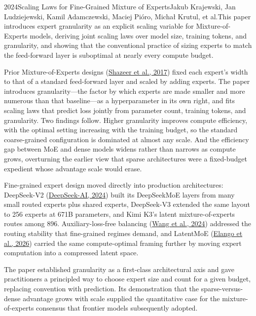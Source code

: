 
\begin{papersummary}{2024}{Scaling Laws for Fine-Grained Mixture of Experts}{Jakub Krajewski, Jan Ludziejewski, Kamil Adamczewski, Maciej Pi\'oro, Micha\l{} Krutul, et al.}{This paper introduces expert granularity as an explicit scaling variable for Mixture-of-Experts models, deriving joint scaling laws over model size, training tokens, and granularity, and showing that the conventional practice of sizing experts to match the feed-forward layer is suboptimal at nearly every compute budget.}

Prior Mixture-of-Experts designs (\hyperref[paper:shazeer-2017-moe]{Shazeer et al., 2017}) fixed each expert's width to that of a standard feed-forward layer and scaled by adding experts. The paper introduces granularity---the factor by which experts are made smaller and more numerous than that baseline---as a hyperparameter in its own right, and fits scaling laws that predict loss jointly from parameter count, training tokens, and granularity. Two findings follow. Higher granularity improves compute efficiency, with the optimal setting increasing with the training budget, so the standard coarse-grained configuration is dominated at almost any scale. And the efficiency gap between MoE and dense models widens rather than narrows as compute grows, overturning the earlier view that sparse architectures were a fixed-budget expedient whose advantage scale would erase.

Fine-grained expert design moved directly into production architectures: DeepSeek-V2 (\hyperref[paper:deepseek-2024-v2]{DeepSeek-AI, 2024}) built its DeepSeekMoE layers from many small routed experts plus shared experts, DeepSeek-V3 extended the same layout to 256 experts at 671B parameters, and Kimi K3's latent mixture-of-experts routes among 896. Auxiliary-loss-free balancing (\hyperref[paper:wang-2024-auxfree]{Wang et al., 2024}) addressed the routing stability that fine-grained regimes demand, and LatentMoE (\hyperref[paper:elango-2026-latentmoe]{Elango et al., 2026}) carried the same compute-optimal framing further by moving expert computation into a compressed latent space.

The paper established granularity as a first-class architectural axis and gave practitioners a principled way to choose expert size and count for a given budget, replacing convention with prediction. Its demonstration that the sparse-versus-dense advantage grows with scale supplied the quantitative case for the mixture-of-experts consensus that frontier models subsequently adopted.

\end{papersummary}
